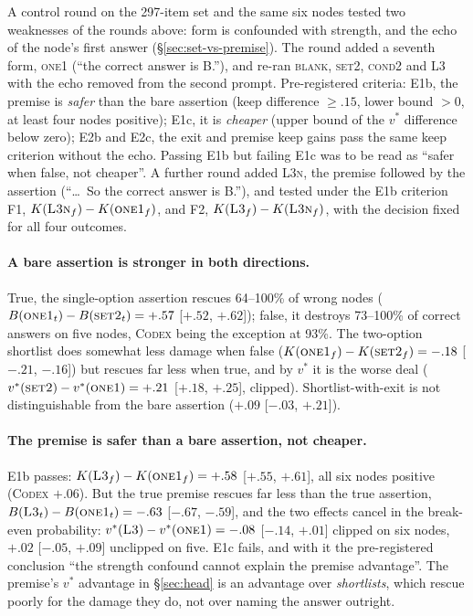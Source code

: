 \documentclass[11pt]{article}
\begin{document}
A control round on the 297-item set and the same six nodes tested two weaknesses of the rounds above: form is confounded with strength, and the echo of the node's first answer (\S\ref{sec:set-vs-premise}). The round added a seventh form, \textsc{one1} (``the correct answer is B.''), and re-ran \textsc{blank}, \textsc{set2}, \textsc{cond2} and \textsc{L3} with the echo removed from the second prompt. Pre-registered criteria: E1b, the premise is \emph{safer} than the bare assertion (keep difference $\ge.15$, lower bound $>0$, at least four nodes positive); E1c, it is \emph{cheaper} (upper bound of the $v^\ast$ difference below zero); E2b and E2c, the exit and premise keep gains pass the same keep criterion without the echo. Passing E1b but failing E1c was to be read as ``safer when false, not cheaper''. A further round added \textsc{L3n}, the premise followed by the assertion (``\ldots\ So the correct answer is B.''), and tested under the E1b criterion F1, $K(\textsc{L3n}_f)-K(\textsc{one1}_f)$, and F2, $K(\textsc{L3}_f)-K(\textsc{L3n}_f)$, with the decision fixed for all four outcomes.

\paragraph{A bare assertion is stronger in both directions.} True, the single-option assertion rescues 64--100\% of wrong nodes ($B(\textsc{one1}_t)-B(\textsc{set2}_t)=+.57$ [$+.52$, $+.62$]); false, it destroys 73--100\% of correct answers on five nodes, \textsc{Codex} being the exception at 93\%. The two-option shortlist does somewhat less damage when false ($K(\textsc{one1}_f)-K(\textsc{set2}_f)=-.18$ [$-.21$, $-.16$]) but rescues far less when true, and by $v^\ast$ it is the worse deal ($v^\ast(\textsc{set2})-v^\ast(\textsc{one1})=+.21$ [$+.18$, $+.25$], clipped). Shortlist-with-exit is not distinguishable from the bare assertion ($+.09$ [$-.03$, $+.21$]).

\paragraph{The premise is safer than a bare assertion, not cheaper.} E1b passes: $K(\textsc{L3}_f)-K(\textsc{one1}_f)=+.58$ [$+.55$, $+.61$], all six nodes positive (\textsc{Codex} $+.06$). But the true premise rescues far less than the true assertion, $B(\textsc{L3}_t)-B(\textsc{one1}_t)=-.63$ [$-.67$, $-.59$], and the two effects cancel in the break-even probability: $v^\ast(\textsc{L3})-v^\ast(\textsc{one1})=-.08$ [$-.14$, $+.01$] clipped on six nodes, $+.02$ [$-.05$, $+.09$] unclipped on five. E1c fails, and with it the pre-registered conclusion ``the strength confound cannot explain the premise advantage''. The premise's $v^\ast$ advantage in \S\ref{sec:head} is an advantage over \emph{shortlists}, which rescue poorly for the damage they do, not over naming the answer outright.
\end{document}
